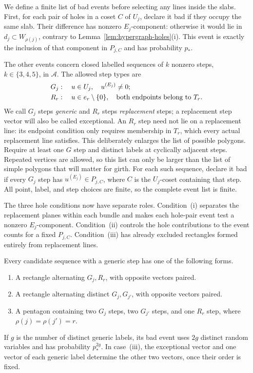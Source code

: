 We define a finite list of bad events before selecting any lines
inside the slabs.  First, for each pair of holes in a coset $C$ of
$U_j$, declare it bad if they occupy the same slab.  Their difference
has nonzero $E_j$-component: otherwise it would lie in
$d_j\subset W_{\rho(j)}$, contrary to
Lemma~\ref{lem:hypergraph-holes}\textup{(i)}.  This event is exactly
the inclusion of that component in $P_{j,C}$ and has probability $p_*$.

The other events concern closed labelled sequences of $k$ nonzero
steps, $k\in\{3,4,5\}$, in $\mathcal A$.  The allowed step types are
\begin{align*}
 G_j &: \quad u\in U_j,\quad u^{(E_j)}\ne0;\\
 R_r &: \quad u\in e_r\setminus\{0\},
               \quad\hbox{both endpoints belong to }T_r.
\end{align*}
We call $G_j$ steps \emph{generic} and $R_r$ steps \emph{replacement}
steps; a replacement step vector will also be called exceptional.
An $R_r$ step need not lie on a replacement line: its endpoint condition
only requires membership in $T_r$, which every actual replacement line
satisfies. This deliberately enlarges the list of possible polygons.
Require at least one $G$ step and distinct labels at cyclically
adjacent steps.  Repeated vertices are allowed, so this list can
only be larger than the list of simple polygons that will matter
for girth.  For each such sequence, declare it bad if every $G_j$
step has $u^{(E_j)}\in P_{j,C}$, where $C$ is the $U_j$-coset
containing that step.  All point, label, and step choices are finite,
so the complete event list is finite.

The three hole conditions now have separate roles. Condition~\textup{(i)}
separates the replacement planes within each bundle and makes each
hole-pair event test a nonzero $E_j$-component. Condition~\textup{(ii)}
controls the hole contributions to the event counts for a fixed
$P_{j,C}$. Condition~\textup{(iii)} has already excluded rectangles
formed entirely from replacement lines.

\begin{lemma}\label{lem:hypergraph-polygons}
Every candidate sequence with a generic step has one of the following
forms.
\begin{enumerate}[label=\textup{(\roman*)}]
 \item A rectangle alternating $G_j,R_r$, with opposite vectors paired.
 \item A rectangle alternating distinct $G_j,G_{j'}$, with opposite
       vectors paired.
 \item A pentagon containing two $G_j$ steps, two $G_{j'}$ steps,
       and one $R_r$ step, where $\rho(j)=\rho(j')=r$.
\end{enumerate}
If $g$ is the number of distinct generic labels, its bad event uses
$2g$ distinct random variables and has probability $p_*^{2g}$.
In case~\textup{(iii)}, the exceptional vector and one vector of each
generic label determine the other two vectors, once their order is fixed.
\end{lemma}

